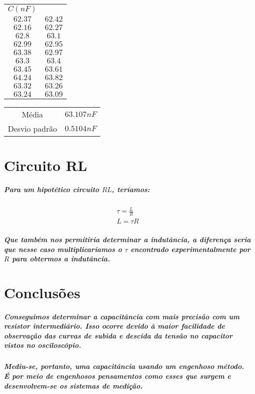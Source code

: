 \documentclass[12pt,twoside, a4paper, twocolumn]{article}
\begin{document}
\begin{center}
    \begin{tabular}{ |cc| }
        \hline
        $ C (nF)$ &       \\
        $62.37$ & $62.42$ \\
        $62.16$ & $62.27$ \\
        $62.8$  & $63.1$  \\
        $62.99$ & $62.95$ \\
        $63.38$ & $62.97$ \\
        $63.3$  & $63.4$  \\
        $63.45$ & $63.61$ \\
        $64.24$ & $63.82$ \\
        $63.32$ & $63.26$ \\
        $63.24$ & $63.09$ \\
        \hline
    \end{tabular}
\end{center}

\begin{center}
    \begin{tabular}{ |cc| }
        \hline
        Média         & $63.107 nF$ \\
        Desvio padrão & $0.5104 nF$  \\
        \hline
    \end{tabular}
\end{center}

\section{Circuito RL}

\subparagraph*{Para um hipotético circuito $RL$, teríamos:}

\begin{equation}
    \begin{aligned}
        \tau = \frac{L}{R} \\
        L = \tau R
    \end{aligned}
\end{equation}

\subparagraph*{Que também nos permitiria determinar a indutância, a diferença seria que nesse caso multiplicaríamos o $\tau$ encontrado experimentalmente por $R$ para obtermos a indutância.}

\section{Conclusões}

\subparagraph*{Conseguimos determinar a capacitância com mais precisão com um resistor intermediário. Isso ocorre devido à maior facilidade de observação das curvas de subida e descida da tensão no capacitor vistos no osciloscópio.}

\subparagraph*{Mediu-se, portanto, uma capacitância usando um engenhoso método. É por meio de engenhosos pensamentos como esses que surgem e desenvolvem-se os sistemas de medição.}
\end{document}
